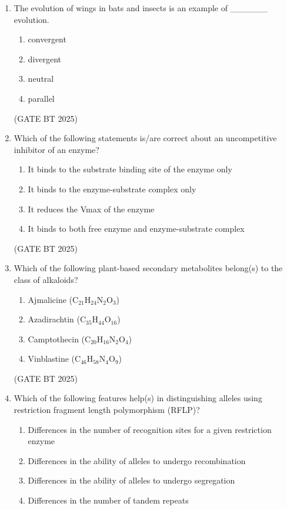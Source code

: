 \documentclass[journal,12pt,onecolumn]{IEEEtran}
\theoremstyle{remark}
\begin{document}
\begin{enumerate}
\item The evolution of wings in bats and insects is an example of \_\_\_\_\_\_ evolution.

\begin{enumerate}
\item convergent \hfill
\item divergent \hfill
\item neutral \hfill
\item parallel
\end{enumerate}

\hfill (GATE BT 2025)

\item Which of the following statements is/are correct about an uncompetitive inhibitor of an enzyme?

\begin{enumerate}
\item It binds to the substrate binding site of the enzyme only \hfill
\item It binds to the enzyme-substrate complex only \hfill
\item It reduces the Vmax of the enzyme \hfill
\item It binds to both free enzyme and enzyme-substrate complex
\end{enumerate}

\hfill (GATE BT 2025)

\item Which of the following plant-based secondary metabolites belong(s) to the class of alkaloids?

\begin{enumerate}
\item Ajmalicine (C$_{21}$H$_{24}$N$_2$O$_3$) \hfill
\item Azadirachtin (C$_{35}$H$_{44}$O$_{16}$) \hfill
\item Camptothecin (C$_{20}$H$_{16}$N$_2$O$_4$) \hfill
\item Vinblastine (C$_{46}$H$_{58}$N$_4$O$_9$)
\end{enumerate}

\hfill (GATE BT 2025)

\item Which of the following features help(s) in distinguishing alleles using restriction fragment length polymorphism (RFLP)?

\begin{enumerate}
\item Differences in the number of recognition sites for a given restriction enzyme \hfill
\item Differences in the ability of alleles to undergo recombination \hfill
\item Differences in the ability of alleles to undergo segregation \hfill
\item Differences in the number of tandem repeats
\end{enumerate}


\end{enumerate}
\end{document}
